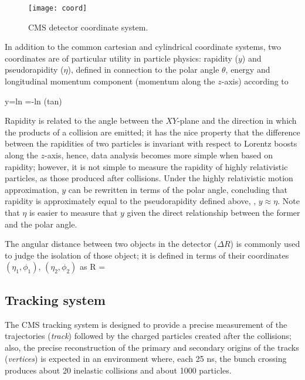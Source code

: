 \begin{figure}[h!]
  \centering
  \texttt{[image: coord]}
  \caption[CMS detector coordinate system]{CMS detector coordinate system.}
  \label{fig:coord}
\end{figure}

In addition to the common cartesian and cylindrical coordinate systems, two coordinates are of particular utility in particle physics: rapidity ($y$) and pseudorapidity ($\eta$), defined in connection to the polar angle $\theta$, energy and longitudinal momentum component (momentum along the $z$-axis) according to

\beqn
y=ln \qquad \eta=-ln \left(tan\right)
\label{eqn:eta}
\eeqn

Rapidity is related to the angle between the $XY$-plane and the direction in which the products of a collision are emitted; it has the nice property that the difference between the rapidities of two particles is invariant with respect to Lorentz boosts along the $z$-axis, hence, data analysis becomes more simple when based on rapidity; however, it is not simple to measure the rapidity of highly relativistic particles, as those produced after \pp collisions. Under the highly relativistic motion approximation, $y$ can be rewritten in terms of the polar angle, concluding that rapidity is approximately equal to the pseudorapidity defined above, \ie, $y\approx\eta$. Note that $\eta$ is easier to measure that $y$ given the direct relationship between the former and the polar angle.

The angular distance between two objects in the detector ($\Delta R$) is commonly used to judge the isolation of those object; it is defined in terms of their coordinates $(\eta_1,\phi_1)$, $(\eta_2,\phi_2)$ as
\beqn
\Delta R = 
\label{delta_r}
\eeqn

\subsection{Tracking system}

The CMS tracking system is designed to provide a precise measurement of the trajectories (\textit{track}) followed by the charged particles created after the \pp collisions; also, the precise reconstruction of the primary and secondary origins of the tracks (\textit{vertices}) is expected in an environment where, each 25 ns, the bunch crossing produces about 20 inelastic collisions and about 1000 particles.%


